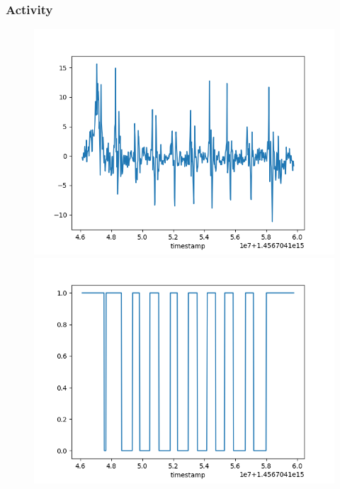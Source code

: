 \documentclass{beamer}
\begin{document}
\begin{frame}
\frametitle{Activity}
\begin{figure}
	\includegraphics[scale=.35]{vanilla_gyro}
	\includegraphics[scale=.35]{activity}
\end{figure}


\end{frame}
\end{document}
